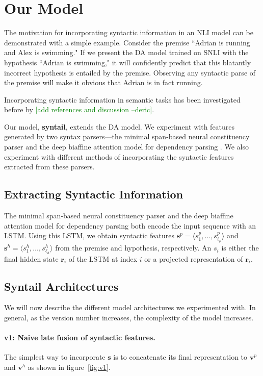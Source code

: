\documentclass[11pt,a4paper]{article}
\newcommand{\dpcomment}[1]{\textcolor{green}{[#1 --deric]}}
\begin{document}
\section{Our Model}

The motivation for incorporating syntactic information in an NLI model
can be demonstrated with a simple example. Consider the premise ``Adrian is running
and Alex is swimming." If we present the DA model trained on SNLI with the
hypothesis ``Adrian is swimming," it will confidently predict that this
blatantly incorrect hypothesis is entailed by the premise. Observing
any syntactic parse of
the premise will make it obvious that Adrian is in fact running.

Incorporating syntactic information in semantic tasks has been investigated
before by \dpcomment{add references and discussion}.

Our model, \textbf{syntail}, extends the DA model.
We experiment with features generated by two syntax parsers---the
minimal span-based neural constituency parser \citep{Stern2017-co} and
the deep biaffine attention model for dependency parsing \citep{Dozat2016-gs}. We also experiment
with different methods of incorporating the syntactic features extracted
from these parsers.

\subsection{Extracting Syntactic Information}

The minimal span-based neural constituency parser and the deep biaffine attention
model for dependency parsing both encode the input sequence with an LSTM. Using
this LSTM, we obtain
syntactic features $\bm{s}^p = \langle s^p_1, \dots, s^p_{\ell_p} \rangle$ and
$\bm{s}^h = \langle s^h_1, \dots, s^h_{\ell_h} \rangle$ from the premise and hypothesis,
respectively. An $s_i$ is either
the final hidden state $\bm{r}_i$ of the LSTM at index $i$ or a projected
representation of $\bm{r}_i$.

\subsection{Syntail Architectures}

We will now describe the different model architectures we experimented with.
In general, as the version number increases, the complexity of the model increases.

\paragraph{v1: Naive late fusion of syntactic features.}
The simplest way to incorporate $\bm{s}$ is to concatenate its final representation to
$\bm{v}^p$ and $\bm{v}^h$ as shown in figure~\ref{fig:v1}.
\end{document}
